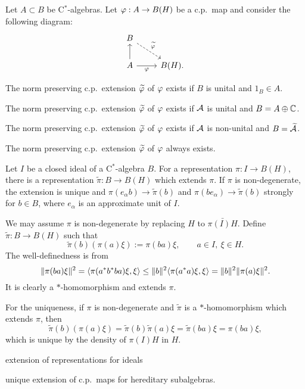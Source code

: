 \documentclass{../../large}
\begin{document}
\begin{prb}
Let $A\subset B$ be C$^*$-algebras.
Let $\varphi:A\to B(H)$ be a c.p.~map and consider the following diagram:
\[\begin{tikzcd}
B\ar[dashed]{dr}{\tilde\f}&\\
A\ar{u}\ar[swap]{r}{\f}&B(H).
\end{tikzcd}\]
\begin{parts}
\item The norm preserving c.p.~extension $\widetilde{\varphi}$ of $\varphi$ exists if $B$ is unital and $1_B\in A$.
\item The norm preserving c.p.~extension $\widetilde{\varphi}$ of $\varphi$ exists if $\mathcal{A}$ is unital and $B=A\oplus\mathbb{C}$.
\item The norm preserving c.p.~extension $\widetilde{\varphi}$ of $\varphi$ exists if $\mathcal{A}$ is non-unital and $B=\widetilde{\mathcal{A}}$.
\item The norm preserving c.p.~extension $\widetilde{\varphi}$ of $\varphi$ always exists.
\end{parts}
\end{prb}

\begin{prb}
Let $I$ be a closed ideal of a C$^*$-algebra $B$.
For a representation $\pi:I\to B(H)$, there is a representation $\tilde\pi:B\to B(H)$ which extends $\pi$.
If $\pi$ is non-degenerate, the extension is unique and $\pi(e_\alpha b)\to\tilde\pi(b)$ and $\pi(be_\alpha)\to\tilde\pi(b)$ strongly for $b\in B$, where $e_\alpha$ is an approximate unit of $I$.
\end{prb}
\begin{pf}
We may assume $\pi$ is non-degenerate by replacing $H$ to $\bar{\pi(I)H}$.
Define $\tilde\pi:B\to B(H)$ such that
\[\tilde\pi(b)(\pi(a)\xi):=\pi(ba)\xi,\qquad a\in I,\ \xi\in H.\]
The well-definedness is from
\[\|\pi(ba)\xi\|^2=\langle\pi(a^*b^*ba)\xi,\xi\rangle\le\|b\|^2\langle\pi(a^*a)\xi,\xi\rangle=\|b\|^2\|\pi(a)\xi\|^2.\]
It is clearly a $*$-homomorphism and extends $\pi$.

For the uniqueness, if $\pi$ is non-degenerate and $\tilde\pi$ is a $*$-homomorphism which extends $\pi$, then
\[\tilde\pi(b)(\pi(a)\xi)=\tilde\pi(b)\tilde\pi(a)\xi=\tilde\pi(ba)\xi=\pi(ba)\xi,\]
which is unique by the density of $\pi(I)H$ in $H$.
\end{pf}

extension of representations for ideals

unique extension of c.p.~maps for hereditary subalgebras.
\end{document}
